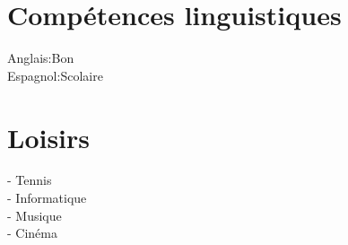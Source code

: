 \documentclass[a4paper]{article}
\begin{document}
\section*{Compétences linguistiques}
 \begin{flushleft} Anglais:Bon
\\Espagnol:Scolaire
\end{flushleft}

\vspace{15cm}

\section{Loisirs}
\begin{flushleft}
- Tennis\\
- Informatique\\
- Musique\\
- Cinéma
\end{flushleft}
\end{document}
